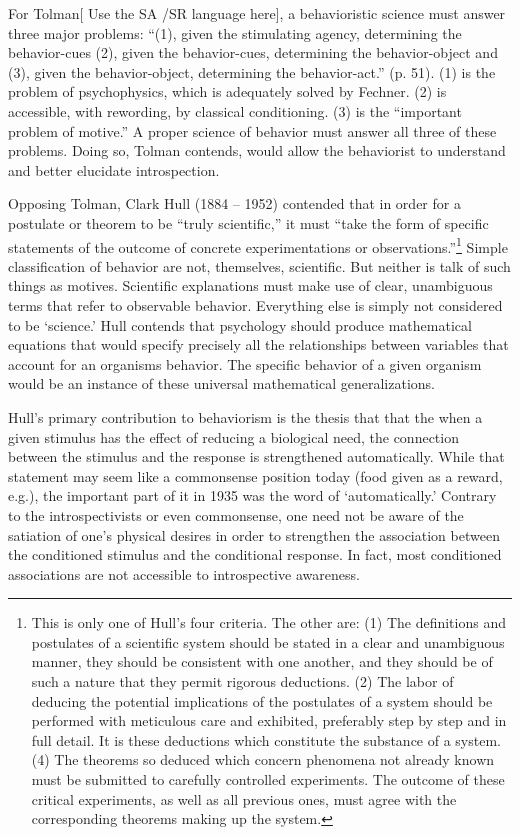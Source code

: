 For Tolman[ Use the SA \slash  SR language here], a behavioristic science must answer three major problems: “(1), given the stimulating agency, determining the behavior-cues (2), given the behavior-cues, determining the behavior-object and (3), given the behavior-object, determining the behavior-act.” (p. 51). (1) is the problem of psychophysics, which is adequately solved by Fechner. (2) is accessible, with rewording, by classical conditioning. (3) is the “important problem of motive.” A proper science of behavior must answer all three of these problems. Doing so, Tolman contends, would allow the behaviorist to understand and better elucidate introspection.

Opposing Tolman, Clark Hull (1884 – 1952) contended that in order for a postulate or theorem to be “truly scientific,” it must “take the form of specific statements of the outcome of concrete experimentations or observations.”\footnote{This is only one of Hull's four criteria. The other are: (1) The definitions and postulates of a scientific system should be stated in a clear and unambiguous manner, they should be consistent with one another, and they should be of such a nature that they permit rigorous deductions. (2) The labor of deducing the potential implications of the postulates of a system should be performed with meticulous care and exhibited, preferably step by step and in full detail. It is these deductions which constitute the substance of a system. (4) The theorems so deduced which concern phenomena not already known must be submitted to carefully controlled experiments. The outcome of these critical experiments, as well as all previous ones, must agree with the corresponding theorems making up the system.} Simple classification of behavior are not, themselves, scientific. But neither is talk of such things as motives. Scientific explanations must make use of clear, unambiguous terms that refer to observable behavior. Everything else is simply not considered to be `science.' Hull contends that psychology should produce mathematical equations that would specify precisely all the relationships between variables that account for an organisms behavior. The specific behavior of a given organism would be an instance of these universal mathematical generalizations.

Hull's primary contribution to behaviorism is the thesis that that the when a given stimulus has the effect of reducing a biological need, the connection between the stimulus and the response is strengthened automatically. While that statement may seem like a commonsense position today (food given as a reward, e.g.), the important part of it in 1935 was the word of `automatically.' Contrary to the introspectivists or even commonsense, one need not be aware of the satiation of one's physical desires in order to strengthen the association between the conditioned stimulus and the conditional response. In fact, most conditioned associations are not accessible to introspective awareness.

